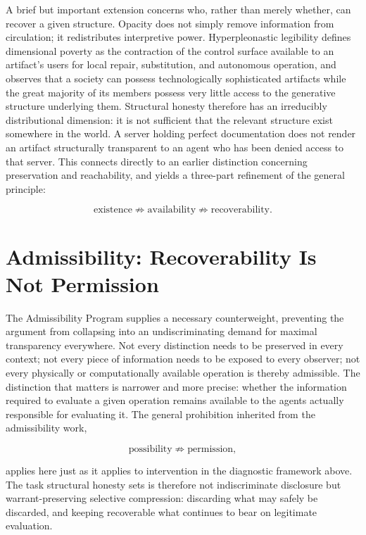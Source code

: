 \documentclass[11pt]{article}
\begin{document}
A brief but important extension concerns who, rather than merely whether, can recover a given structure. Opacity does not simply remove information from circulation; it redistributes interpretive power. Hyperpleonastic legibility defines dimensional poverty as the contraction of the control surface available to an artifact's users for local repair, substitution, and autonomous operation, and observes that a society can possess technologically sophisticated artifacts while the great majority of its members possess very little access to the generative structure underlying them. Structural honesty therefore has an irreducibly distributional dimension: it is not sufficient that the relevant structure exist somewhere in the world. A server holding perfect documentation does not render an artifact structurally transparent to an agent who has been denied access to that server. This connects directly to an earlier distinction concerning preservation and reachability, and yields a three-part refinement of the general principle:

\[
\boxed{\text{existence} \not\Rightarrow \text{availability} \not\Rightarrow \text{recoverability.}}
\]

\section{Admissibility: Recoverability Is Not Permission}

The Admissibility Program supplies a necessary counterweight, preventing the argument from collapsing into an undiscriminating demand for maximal transparency everywhere. Not every distinction needs to be preserved in every context; not every piece of information needs to be exposed to every observer; not every physically or computationally available operation is thereby admissible. The distinction that matters is narrower and more precise: whether the information required to evaluate a given operation remains available to the agents actually responsible for evaluating it. The general prohibition inherited from the admissibility work,

\[
\text{possibility} \not\Rightarrow \text{permission},
\]

applies here just as it applies to intervention in the diagnostic framework above. The task structural honesty sets is therefore not indiscriminate disclosure but warrant-preserving selective compression: discarding what may safely be discarded, and keeping recoverable what continues to bear on legitimate evaluation.
\end{document}

